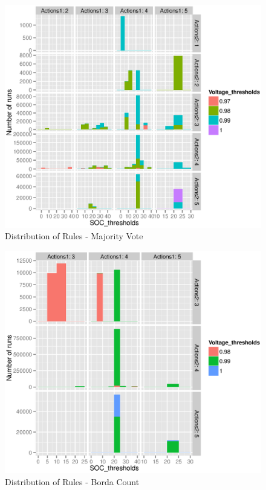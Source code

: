 \documentclass[a4paper]{article}
\begin{document}
\begin{figure}[!ht]
\includegraphics[width = \textwidth]{rules_voltage_d_majority.eps}
\caption{Distribution of Rules - Majority Vote}
\label{colored_majority_d}
\end{figure}


\begin{figure}[!ht]
\includegraphics[width = \textwidth]{rules_voltage_d_borda.eps}
\caption{Distribution of Rules - Borda Count}
\label{colored_borda_d}
\end{figure}
\end{document}
